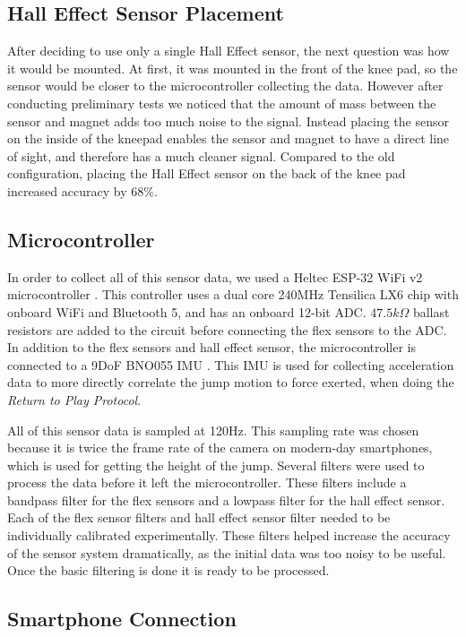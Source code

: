 \documentclass[manuscript,screen,review]{acmart}
\begin{document}
\subsection{Hall Effect Sensor Placement}

After deciding to use only a single Hall Effect sensor, the next question was how it would be mounted. At first, it was mounted in the front of the knee pad, so the sensor would be closer to the microcontroller collecting the data. However after conducting preliminary tests we noticed that the amount of mass between the sensor and magnet adds too much noise to the signal. Instead placing the sensor on the inside of the kneepad enables the sensor and magnet to have a direct line of sight, and therefore has a much cleaner signal. Compared to the old configuration, placing the Hall Effect sensor on the back of the knee pad increased accuracy by $68\%$.

\subsection{Microcontroller}

In order to collect all of this sensor data, we used a Heltec ESP-32 WiFi v2 microcontroller \cite{heltec-wifi-kit-32}. This controller uses a dual core 240MHz Tensilica LX6 chip with onboard WiFi and Bluetooth 5, and has an onboard 12-bit ADC. $47.5 k\Omega$ ballast resistors are added to the circuit before connecting the flex sensors to the ADC. In addition to the flex sensors and hall effect sensor, the microcontroller is connected to a 9DoF BNO055 IMU \cite{imu-BNO055}. This IMU is used for collecting acceleration data to more directly correlate the jump motion to force exerted, when doing the \textit{Return to Play Protocol}.

All of this sensor data is sampled at 120Hz. This sampling rate was chosen because it is twice the frame rate of the camera on modern-day smartphones, which is used for getting the height of the jump. Several filters were used to process the data before it left the microcontroller. These filters include a bandpass filter for the flex sensors and a lowpass filter for the hall effect sensor. Each of the flex sensor filters and hall effect sensor filter needed to be individually calibrated experimentally. These filters helped increase the accuracy of the sensor system dramatically, as the initial data was too noisy to be useful. Once the basic filtering is done it is ready to be processed.

\subsection{Smartphone Connection}
\end{document}
